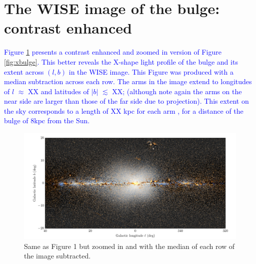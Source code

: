\documentclass[12pt, preprint]{aastex}
\begin{document}
\section{The WISE image of the bulge: contrast enhanced}

\textcolor{blue}{Figure \ref{fig:filt} presents a contrast enhanced and zoomed in version of Figure \ref{fig:xbulge}. This better reveals the X-shape light profile of the bulge and its extent across $(l,b)$ in the WISE image. This Figure was produced with a median subtraction across each row. The arms in the image extend to longitudes of $l$ $\approx$ XX and latitudes of $|b|$ $\lesssim$ XX; (although note again the arms on the near side are larger than those of the far side due to projection). This extent on the sky corresponds to a length of XX kpc for each arm  , for a distance of the bulge of 8kpc from the Sun. }

\begin{figure}[h!]
\centering
        \includegraphics[width=\textwidth]{xbulge-01}
\caption{Same as Figure 1 but zoomed in and with the median of each row of the image subtracted.}
\label{fig:filt}
\end{figure}
\end{document}
